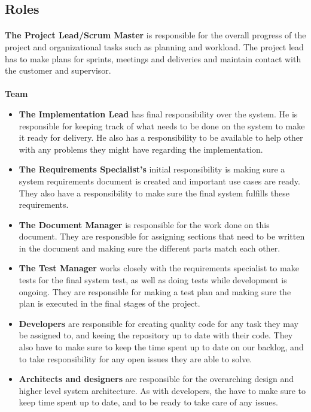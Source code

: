 \subsection{Roles}
\paragraph*{} \textbf{The Project Lead/Scrum Master} is responsible for the overall progress of the project and organizational tasks such as planning and workload. The project lead has to make plans for sprints, meetings and deliveries and maintain contact with the customer and supervisor.

\paragraph*{} \textbf{Team}
\begin{itemize}
\item \textbf{The Implementation Lead} has final responsibility over the system. He is responsible for keeping track of what needs to be done on the system to make it ready for delivery. He also has a responsibility to be available to help other with any problems they might have regarding the implementation.
\item \textbf{The Requirements Specialist's} initial responsibility is making sure a system requirements document is created and important use cases are ready. They also have a responsibility to make sure the final system fulfills these requirements.
\item \textbf{The Document Manager} is responsible for the work done on this document. They are responsible for assigning sections that need to be written in the document and making sure the different parts match each other.
\item \textbf{The Test Manager} works closely with the requirements specialist to make tests for the final system test, as well as doing tests while development is ongoing. They are responsible for making a test plan and making sure the plan is executed in the final stages of the project.
\item \textbf{Developers} are responsible for creating quality code for any task they may be assigned to, and keeing the repository up to date with their code. They also have to make sure to keep the time spent up to date on our backlog, and to take responsibility for any open issues they are able to solve.
\item \textbf{Architects and designers} are responsible for the overarching design and higher level system architecture. As with developers, the have to make sure to keep time spent up to date, and to be ready to take care of any issues.
\end{itemize}

